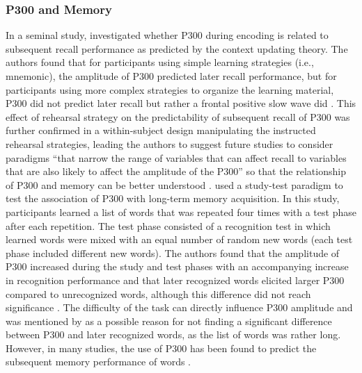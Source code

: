 \subsubsection{P300 and Memory}
In a seminal study, \textcite{karisP300MemoryIndividual1984} investigated whether P300 during encoding is related to subsequent recall performance as predicted by the context updating theory. The authors found that for participants using simple learning strategies (i.e., mnemonic), the amplitude of P300 predicted later recall performance, but for participants using more complex strategies to organize the learning material, P300 did not predict later recall but rather a frontal positive slow wave did \parencite{karisP300MemoryIndividual1984}. This effect of rehearsal strategy on the predictability of subsequent recall of P300 was further confirmed in a within-subject design manipulating the instructed rehearsal strategies, leading the authors to suggest future studies to consider paradigms “that narrow the range of variables that can affect recall to variables that are also likely to affect the amplitude of the P300” so that the relationship of P300 and memory can be better understood \parencite[page. 300]{fabianiEffectsMnemonicStrategy1990}.
\textcite{johnsonjr.P300LongTermMemory1985} used a study-test paradigm to test the association of P300 with long-term memory acquisition. In this study, participants learned a list of words that was repeated four times with a test phase after each repetition. The test phase consisted of a recognition test in which learned words were mixed with an equal number of random new words (each test phase included different new words). The authors found that the amplitude of P300 increased during the study and test phases with an accompanying increase in recognition performance and that later recognized words elicited larger P300 compared to unrecognized words, although this difference did not reach significance \parencite{johnsonjr.P300LongTermMemory1985}. The difficulty of the task can directly influence P300 amplitude \parencite{courchesneChangesP3Waves1978, kokUtilityP3Amplitude2001} and was mentioned by \textcite{johnsonjr.P300LongTermMemory1985} as a possible reason for not finding a significant difference between P300 and later recognized words, as the list of words was rather long. However, in many studies, the use of P300 has been found to predict the subsequent memory performance of words \parencite[see.,][]{pallerERPsPredictiveSubsequent1988}. 
